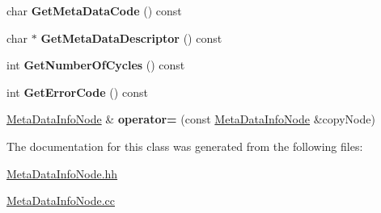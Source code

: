 \begin{DoxyCompactItemize}
\item 
\hypertarget{class_meta_data_info_node_a0f63236dcac0a8f1d56809b10eb5c755}{char {\bfseries Get\-Meta\-Data\-Code} () const }\label{class_meta_data_info_node_a0f63236dcac0a8f1d56809b10eb5c755}

\item 
\hypertarget{class_meta_data_info_node_a01c79cd3dd6fc1cd49c0b181462082b7}{char $\ast$ {\bfseries Get\-Meta\-Data\-Descriptor} () const }\label{class_meta_data_info_node_a01c79cd3dd6fc1cd49c0b181462082b7}

\item 
\hypertarget{class_meta_data_info_node_ab6fe7d379a9551aa45e4af6b8d97bf08}{int {\bfseries Get\-Number\-Of\-Cycles} () const }\label{class_meta_data_info_node_ab6fe7d379a9551aa45e4af6b8d97bf08}

\item 
\hypertarget{class_meta_data_info_node_a8698b1ea4f677d35854a1ec57d36dfcf}{int {\bfseries Get\-Error\-Code} () const }\label{class_meta_data_info_node_a8698b1ea4f677d35854a1ec57d36dfcf}

\item 
\hypertarget{class_meta_data_info_node_a96f59b838b7d0417a63170b2167b5916}{\hyperlink{class_meta_data_info_node}{Meta\-Data\-Info\-Node} \& {\bfseries operator=} (const \hyperlink{class_meta_data_info_node}{Meta\-Data\-Info\-Node} \&copy\-Node)}\label{class_meta_data_info_node_a96f59b838b7d0417a63170b2167b5916}

\end{DoxyCompactItemize}


The documentation for this class was generated from the following files\-:\begin{DoxyCompactItemize}
\item 
\hyperlink{_meta_data_info_node_8hh}{Meta\-Data\-Info\-Node.\-hh}\item 
\hyperlink{_meta_data_info_node_8cc}{Meta\-Data\-Info\-Node.\-cc}\end{DoxyCompactItemize}
